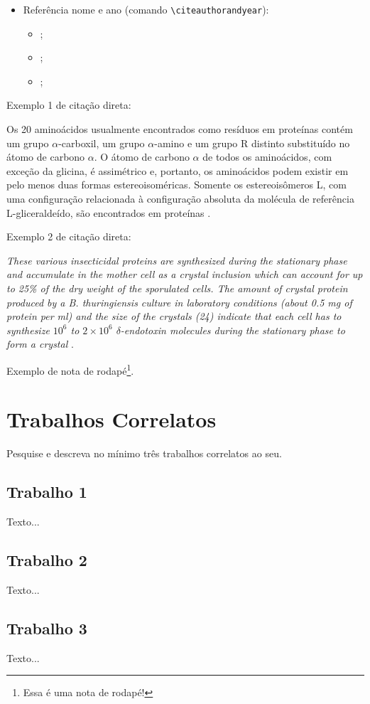 \begin{itemize}
\begin{itemize}
		\item \cite{Abedi2014, Agaisse1995};
		\item \cite{AgapitoTenfen2014, BtNomenclature2016, Nelson2014};
	\end{itemize}
	\item Referência nome e ano (comando \verb|\citeauthorandyear|):
	\begin{itemize}
		\item {};
		\item {};
		\item {};
	\end{itemize}
\end{itemize}


Exemplo 1 de citação direta:

\begin{citacao}
	Os 20 aminoácidos usualmente encontrados como resíduos em proteínas contém um grupo $\alpha$-carboxil, um grupo $\alpha$-amino e um grupo R distinto substituído no átomo de carbono $\alpha$. O átomo de carbono $\alpha$ de todos os aminoácidos, com exceção da glicina, é assimétrico e, portanto, os aminoácidos podem existir em pelo menos duas formas estereoisoméricas. Somente os estereoisômeros L, com uma configuração relacionada à configuração absoluta da molécula de referência L-gliceraldeído, são encontrados em proteínas \cite[p. 81]{Nelson2014}.
\end{citacao}

Exemplo 2 de citação direta:

\begin{citacao}
	\textit{These various insecticidal proteins are synthesized during the stationary phase and accumulate in the mother cell as a crystal inclusion which can account for up to 25\% of the dry weight of the sporulated cells. The amount of crystal protein produced by a B. thuringiensis culture in laboratory conditions (about 0.5 mg of protein per ml) and the size of the crystals (24) indicate that each cell has to synthesize $10^6$ to $2 \times 10^6$ $\delta$-endotoxin molecules during the stationary phase to form a crystal} \cite[p. 1]{Agaisse1995}.
\end{citacao}

Exemplo de nota de rodapé\footnote{Essa é uma nota de rodapé!}.


\section{Trabalhos Correlatos}

Pesquise e descreva no mínimo três trabalhos correlatos ao seu.

\subsection{Trabalho 1}

Texto...

\subsection{Trabalho 2}

Texto...

\subsection{Trabalho 3}

Texto...
